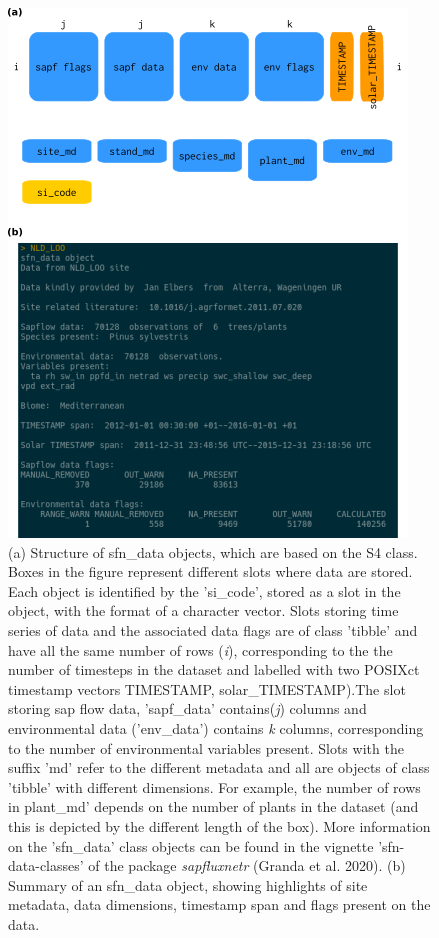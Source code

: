 \documentclass[11pt,twoside]{reedthesis}
\begin{document}
\setlength{\abovecaptionskip}{15pt}
\begin{figure}

{\centering \includegraphics[width=0.7\linewidth]{figure/appendixB/schematics} 

}

\caption[Structure of sfn\_data objects.]{(a) Structure of sfn\_data objects, which are based on the S4 class. Boxes in the figure represent different slots where data are stored. Each object is identified by the 'si\_code', stored as a slot in the object, with the format of a character vector. Slots storing time series of data and the associated data flags are of class 'tibble' and have all the same number of rows (\textit{i}), corresponding to the the number of timesteps in the dataset and labelled with two POSIXct timestamp vectors TIMESTAMP, solar\_TIMESTAMP).The slot storing sap flow data, 'sapf\_data' contains(\textit{j}) columns and environmental data ('env\_data') contains \textit{k} columns, corresponding to the number of environmental variables present. Slots with the suffix 'md' refer to the different metadata and all are objects of class 'tibble' with different dimensions. For example, the number of rows in plant\_md' depends on the number of plants in the dataset (and this is depicted by the different length of the box). More information on the 'sfn\_data' class objects can be found in the vignette 'sfn-data-classes' of the package \textit{sapfluxnetr} (Granda et al. 2020). (b) Summary of an sfn\_data object, showing highlights of site metadata, data dimensions, timestamp span and flags present on the data.}\label{fig:unnamed-chunk-6}
\end{figure}
\setlength{\abovecaptionskip}{0pt} \newpage
\end{document}
